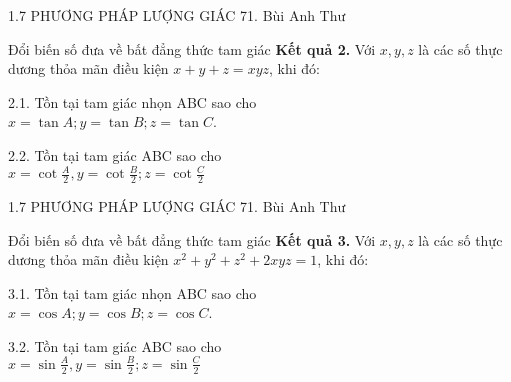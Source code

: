    \begin{frame}{1.7 PHƯƠNG PHÁP LƯỢNG GIÁC \hspace{3cm}  71. Bùi Anh Thư} 
\begin{block}{Đổi biến số đưa về bất đẳng thức tam giác}
   \textbf{Kết quả 2.} Với $x,y,z$ là các số thực dương thỏa mãn điều kiện $x+y+z=xyz$, khi đó:\\
   \vspace{0,4cm}
   
   2.1. Tồn tại tam giác nhọn ABC sao cho\\ $x=\tan A; y=\tan B; z= \tan C$.\\
   \vspace{0,4cm}
   
   2.2. Tồn tại tam giác ABC sao cho\\ $x=\cot{\frac{A}{2}}, y=\cot{\frac{B}{2}}; z=\cot{\frac{C}{2}}$\\
\end{block} 
\end{frame}

\begin{frame}{1.7 PHƯƠNG PHÁP LƯỢNG GIÁC \hspace{3cm}  71. Bùi Anh Thư} 
\begin{block}{Đổi biến số đưa về bất đẳng thức tam giác}
   \textbf{Kết quả 3.} Với $x,y,z$ là các số thực dương thỏa mãn điều kiện $x^2+y^2+z^2+2xyz=1$, khi đó:\\
   \vspace{0,4cm}
   
   3.1. Tồn tại tam giác nhọn ABC sao cho\\ $x=\cos{A}; y=\cos{B}; z= \cos{C}$.\\
   \vspace{0,4cm}
   
   3.2. Tồn tại tam giác ABC sao cho\\ $x=\sin{\frac{A}{2}}, y=\sin{\frac{B}{2}}; z=\sin{\frac{C}{2}}$\\
\end{block} 
\end{frame}


